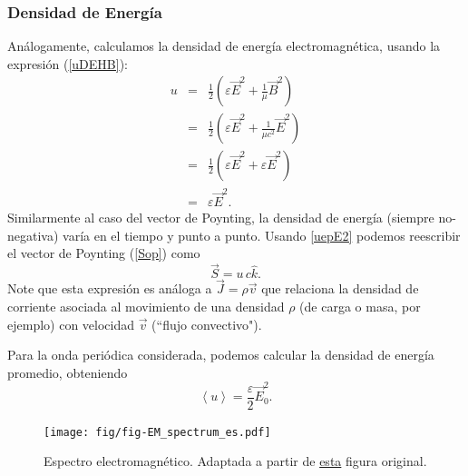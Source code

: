 \subsubsection{Densidad de Energía}
Análogamente, calculamos la densidad de energía electromagnética, usando la expresión (\ref{uDEHB}):
\begin{eqnarray}
 u&=&\frac{1}{2}\left(\varepsilon\vec{E}^2+\frac{1}{\mu}\vec{B}^2\right)\\
&=&\frac{1}{2}\left(\varepsilon\vec{E}^2+\frac{1}{\mu c^2}\vec{E}^2\right)\\
&=&\frac{1}{2}\left(\varepsilon\vec{E}^2+\varepsilon\vec{E}^2\right)\\
&=&\varepsilon\vec{E}^2. \label{uepE2}
\end{eqnarray}
Similarmente al caso del vector de Poynting, la densidad de energía (siempre no-negativa) varía en el tiempo y punto a punto. 
Usando \eqref{uepE2} podemos reescribir el vector de Poynting (\ref{Sop}) como
\begin{equation}
 \vec{S}=u\,c\hat{k}.
\end{equation}
Note que esta expresión es análoga a $\vec{J}=\rho\vec{v}$ que relaciona la densidad de corriente asociada al movimiento de una densidad $\rho$ (de carga o masa, por ejemplo) con velocidad $\vec{v}$ (``flujo convectivo").

Para la onda periódica considerada, podemos calcular la densidad de energía promedio, obteniendo
\begin{equation}\label{uprom}
\left<u\right>=\frac{\varepsilon}{2}\vec{E}_0^2.
\end{equation}

\begin{figure}[!h]
\centerline{\texttt{[image: fig/fig-EM\_spectrum\_es.pdf]}}
\caption{Espectro electromagnético. Adaptada a partir de \href{http://commons.wikimedia.org/wiki/File:EM_spectrum_es.svg}{esta} figura original.}
\label{fig:EMS}
\end{figure}

